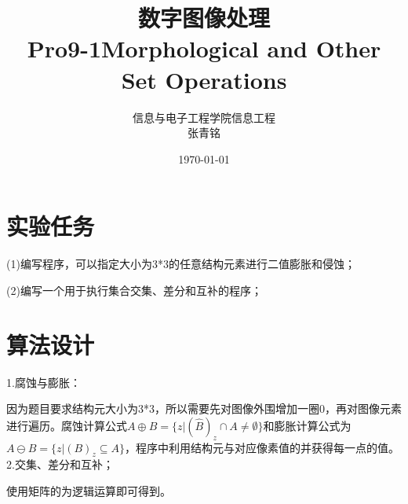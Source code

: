 \documentclass[12pt]{article}
\title{{\Huge{\textbf{数字图像处理}}}\\Pro9-1\quad  Morphological and Other Set Operations}
\author{信息与电子工程学院\quad 信息工程 \quad 3200105426\\张青铭}
\date{\today}
\begin{document}
\maketitle
\section{实验任务}
(1)编写程序，可以指定大小为3*3的任意结构元素进行二值膨胀和侵蚀；

(2)编写一个用于执行集合交集、差分和互补的程序；
\section{算法设计}
1.腐蚀与膨胀：

因为题目要求结构元大小为3*3，所以需要先对图像外围增加一圈0，再对图像元素进行遍历。腐蚀计算公式$ A \oplus B=\{z|(\hat B)_z \cap A \neq\emptyset \} $和膨胀计算公式为$ A \ominus B=\{ z|(B)_z \subseteq A\} $，程序中利用结构元与对应像素值的并获得每一点的值。
\\

2.交集、差分和互补；

使用矩阵的为逻辑运算即可得到。
\end{document}
